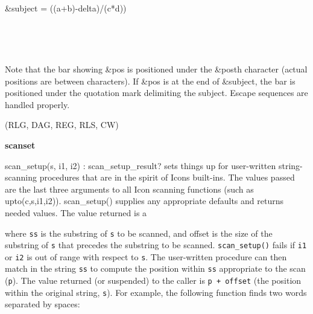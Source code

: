 {\ttfamily
{\textbar}
\ \ \ \ \ \ \ \ \ \ \ \ \ \ \ \ \ \ \ \ \ \ \ \ \ \ \ \ \ \ \ \ \ \ {\textbar}}

{\ttfamily
{\textbar}
\ \ \ \ \ \ \ \ \ \ \ \ \ \ \ \ \ \ \ \ \ \ \ \ \ \ \ \ \ \ \ \ \ \ {\textbar}}

{\ttfamily
{\textbar} \&subject =
{\textquotedbl}((a+b)-delta)/(c*d)){\textquotedbl} {\textbar}}

{\ttfamily
{\textbar} \ \ \ \ \ \ \ \ \ \ \ \ \ \ \ \ \ \ \ \ \ \ \ \ \ {\textbar}
\ \ \ \ \ \ \ {\textbar}}

{\ttfamily
{\textbar}
\ \ \ \ \ \ \ \ \ \ \ \ \ \ \ \ \ \ \ \ \ \ \ \ \ \ \ \ \ \ \ \ \ \ {\textbar}}

\iconcode{
{}-{}-{}-{}-{}-{}-{}-{}-{}-{}-{}-{}-{}-{}-{}-{}-{}-{}-{}-{}-{}-{}-{}-{}-{}-{}-{}-{}-{}-{}-{}-{}-{}-{}-{}-{}-{}-}

Note that the bar showing \textsf{\&pos} is positioned under the
\textsf{\&pos{\textquotesingle}}th character (actual positions are
between characters). If \textsf{\&pos} is at the end of
\textsf{\&subject}, the bar is positioned under the quotation mark
delimiting the subject. Escape sequences are handled properly. 

(RLG, DAG, REG, RLS, CW)

{\sffamily\bfseries
scanset}

\textsf{scan\_setup(s, i1, i2) : scan\_setup\_result?} sets things up
for user-written string-scanning procedures that are in the spirit of
Icon{\textquotesingle}s built-ins. The values passed are the last three
arguments to all Icon scanning functions (such as
\textsf{upto(c,s,i1,i2)}). \textsf{scan\_setup()} supplies any
appropriate defaults and returns needed values. The value returned is a


where \texttt{ss} is the substring of \texttt{s} to be scanned, and
offset is the size of the substring of \texttt{s} that precedes the
substring to be scanned. \texttt{scan\_setup()} fails if \texttt{i1} or
\texttt{i2} is out of range with respect to \texttt{s}. The
user-written procedure can then match in the string \texttt{ss} to
compute the position within \texttt{ss} appropriate to the scan
(\texttt{p}). The value returned (or suspended) to the caller is
\texttt{p + offset} (the position within the original string,
\texttt{s}). For example, the following function finds two words
separated by spaces:

